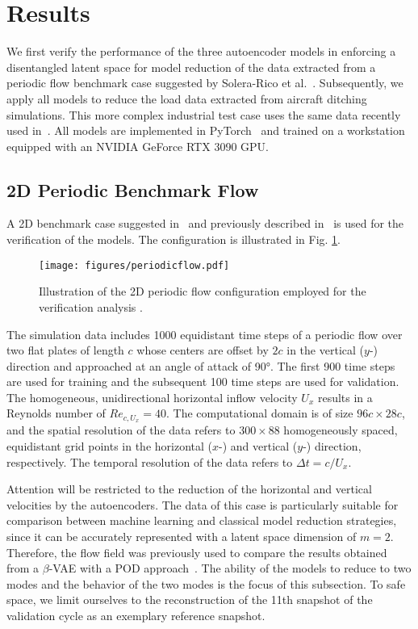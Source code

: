 \section{Results}
\label{sec:3}
We first verify the performance of the three autoencoder models
 in enforcing a disentangled latent space for model reduction of the data extracted from a periodic flow benchmark case suggested by Solera-Rico et al.~\cite{solera-rico:2024, solera_rico_2024_dataset}. 
%
Subsequently, we apply all models to reduce the load data extracted from aircraft ditching simulations. This more complex industrial test case uses the same data recently used in~\cite{schwarz:2024}. 
%
All models are implemented in PyTorch~\cite{NEURIPS2019_9015} and trained on a workstation equipped with an NVIDIA GeForce RTX 3090 GPU. 


\subsection{2D Periodic Benchmark Flow}
\label{sec:periodicflow}
A 2D benchmark case suggested in~\cite{solera-rico:2024} {and previously described in~\cite{Asztalos:2024}} is used for the verification of the models. The configuration is illustrated in Fig. \ref{fig:periodic_flow_scheme}.
\begin{figure}[!h]
     \centering
    \texttt{[image: figures/periodicflow.pdf]}
    \caption{{Illustration of the 2D periodic flow configuration employed for the verification analysis \cite{solera-rico:2024, Asztalos:2024, solera_rico_2024_dataset}}.}
    \label{fig:periodic_flow_scheme}
\end{figure}
The simulation data includes 1000 equidistant
time steps of a periodic flow over two flat plates of length $c$ 
whose centers are offset by $2c$ in the vertical ($y$-) direction
 and approached at an angle of attack of 90°. The first 900 time steps are used for training and the subsequent 100 time steps are used for validation.
The homogeneous, unidirectional horizontal inflow velocity $U_x$ results in a Reynolds number of $Re_{c,U_x}=40$. 
 The computational domain is of size $96c\times28c$, and the spatial resolution of the data refers to $300 \times 88$ homogeneously spaced, equidistant  
grid points in the horizontal ($x$-) and vertical ($y$-) direction, respectively. The temporal resolution of the data refers to $\Delta t= c/U_x$. 

Attention will be restricted to the reduction of the horizontal and vertical velocities by the autoencoders.  The data of this case is particularly suitable for comparison between machine learning and classical model reduction strategies, since it can be accurately represented with a latent space dimension of $m=2$. Therefore, the flow field was previously used to compare the results obtained from a $\beta$-VAE with a POD approach~\cite{solera-rico:2024}. The ability of the models to reduce to two modes and the behavior of the two modes is the focus of this subsection. To safe space, we limit ourselves to the reconstruction of the 11th snapshot of the validation cycle as an exemplary reference snapshot.


